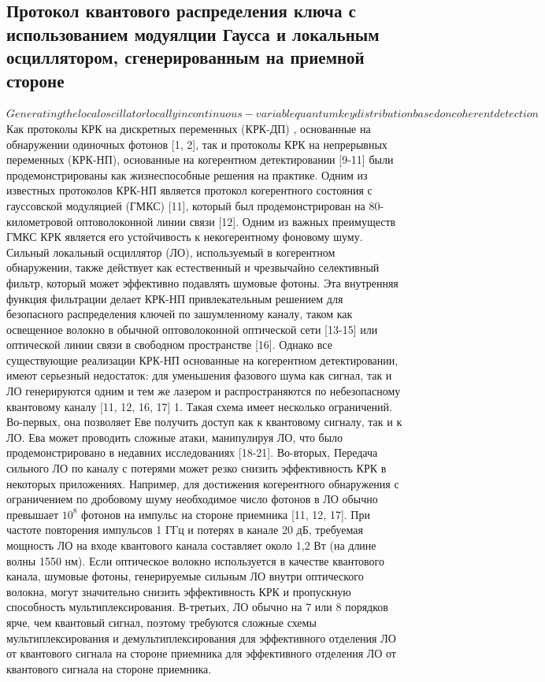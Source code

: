 \subsection{Протокол квантового распределения ключа с использованием модуялции Гаусса и локальным осциллятором, сгенерированным на приемной стороне}\label{sec:ch1/sect4/subsec2} $Generating the local oscillator locally in continuous-variable quantum key
distribution based on coherent detection$
Как протоколы КРК на дискретных переменных  (КРК-ДП) , основанные на обнаружении одиночных фотонов [1, 2], так и протоколы КРК на непрерывных переменных (КРК-НП), основанные на когерентном детектировании [9-11] были продемонстрированы как жизнеспособные решения на практике. Одним из известных протоколов КРК-НП является протокол когерентного состояния с гауссовской модуляцией (ГМКС) [11], который был продемонстрирован на 80-километровой оптоволоконной  линии связи [12]. Одним из важных преимуществ ГМКС КРК  является его устойчивость к некогерентному фоновому шуму. Сильный локальный осциллятор (ЛО), используемый в когерентном обнаружении, также действует как естественный и чрезвычайно селективный фильтр, который может эффективно подавлять шумовые фотоны. Эта внутренняя функция фильтрации делает КРК-НП привлекательным решением для безопасного распределения ключей по зашумленному каналу, таком как освещенное волокно в обычной оптоволоконной оптической сети [13-15] или оптической линии связи в свободном пространстве [16].
Однако все существующие реализации КРК-НП основанные на когерентном детектировании, имеют серьезный недостаток: для уменьшения фазового шума как сигнал, так и ЛО генерируются одним и тем же лазером и распространяются по небезопасному квантовому каналу [11, 12, 16, 17] 1. Такая схема имеет несколько ограничений. Во-первых, она позволяет Еве получить доступ как к квантовому сигналу, так и к ЛО. Ева может проводить сложные атаки, манипулируя ЛО, что было продемонстрировано в недавних исследованиях [18-21]. Во-вторых, Передача сильного ЛО по каналу с потерями может резко снизить эффективность КРК в некоторых приложениях. Например, для достижения когерентного обнаружения с ограничением по дробовому шуму необходимое число фотонов в ЛО обычно превышает $10^8$ фотонов на импульс на стороне приемника [11, 12, 17]. При частоте повторения импульсов 1 ГГц и потерях в канале 20 дБ, требуемая мощность ЛО на входе квантового канала составляет около 1,2 Вт (на длине волны 1550 нм). Если оптическое волокно используется в качестве квантового канала, шумовые фотоны, генерируемые сильным ЛО внутри оптического волокна, могут значительно снизить эффективность КРК и пропускную способность мультиплексирования. В-третьих, ЛО обычно на 7 или 8 порядков ярче, чем квантовый сигнал, поэтому требуются сложные схемы мультиплексирования и демультиплексирования для эффективного отделения ЛО от квантового сигнала на стороне приемника для эффективного отделения ЛО от квантового сигнала на стороне приемника.
